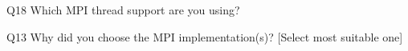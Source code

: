 \begin{description}%
\item{Q18} Which MPI thread support are you using?%
\item{Q13} Why did you choose the MPI implementation(s)? [Select most suitable one]%
\end{description}%
